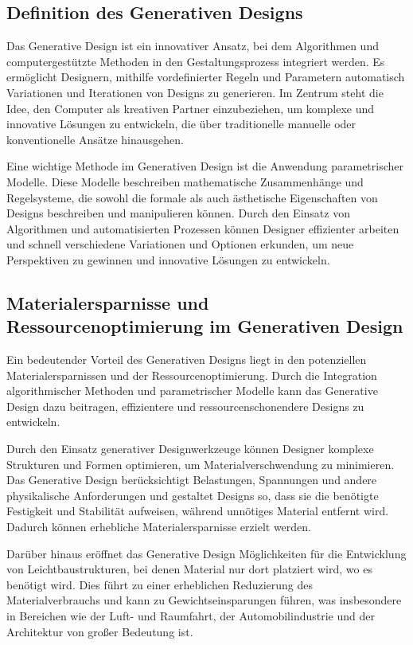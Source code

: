 \subsection*{Definition des Generativen Designs}
Das Generative Design ist ein innovativer Ansatz, bei dem Algorithmen und computergestützte Methoden in den Gestaltungsprozess integriert werden. Es ermöglicht Designern, mithilfe vordefinierter Regeln und Parametern automatisch Variationen und Iterationen von Designs zu generieren. Im Zentrum steht die Idee, den Computer als kreativen Partner einzubeziehen, um komplexe und innovative Lösungen zu entwickeln, die über traditionelle manuelle oder konventionelle Ansätze hinausgehen.

Eine wichtige Methode im Generativen Design ist die Anwendung parametrischer Modelle. Diese Modelle beschreiben mathematische Zusammenhänge und Regelsysteme, die sowohl die formale als auch ästhetische Eigenschaften von Designs beschreiben und manipulieren können. Durch den Einsatz von Algorithmen und automatisierten Prozessen können Designer effizienter arbeiten und schnell verschiedene Variationen und Optionen erkunden, um neue Perspektiven zu gewinnen und innovative Lösungen zu entwickeln.

\subsection*{Materialersparnisse und Ressourcenoptimierung im Generativen Design}
Ein bedeutender Vorteil des Generativen Designs liegt in den potenziellen Materialersparnissen und der Ressourcenoptimierung. Durch die Integration algorithmischer Methoden und parametrischer Modelle kann das Generative Design dazu beitragen, effizientere und ressourcenschonendere Designs zu entwickeln.

Durch den Einsatz generativer Designwerkzeuge können Designer komplexe Strukturen und Formen optimieren, um Materialverschwendung zu minimieren. Das Generative Design berücksichtigt Belastungen, Spannungen und andere physikalische Anforderungen und gestaltet Designs so, dass sie die benötigte Festigkeit und Stabilität aufweisen, während unnötiges Material entfernt wird. Dadurch können erhebliche Materialersparnisse erzielt werden.

Darüber hinaus eröffnet das Generative Design Möglichkeiten für die Entwicklung von Leichtbaustrukturen, bei denen Material nur dort platziert wird, wo es benötigt wird. Dies führt zu einer erheblichen Reduzierung des Materialverbrauchs und kann zu Gewichtseinsparungen führen, was insbesondere in Bereichen wie der Luft- und Raumfahrt, der Automobilindustrie und der Architektur von großer Bedeutung ist.

